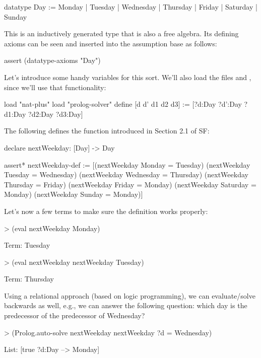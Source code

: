 \begin{tcAthena}
datatype Day := Monday | Tuesday | Wednesday | Thursday | Friday | Saturday | Sunday 
\end{tcAthena}
This is an inductively generated type that is also a free algebra. Its defining axioms can be seen
and inserted into the assumption base as follows:
\begin{tcAthena}
assert (datatype-axioms "Day")
\end{tcAthena}
Let's introduce some handy variables for this sort. We'll also load the files  and , since we'll
use that functionality: 
\begin{tcAthena}
load "nat-plus"
load "prolog-solver"
define [d d' d1 d2 d3] := [?d:Day ?d':Day ?d1:Day ?d2:Day ?d3:Day]
\end{tcAthena}
The following defines the  function introduced in Section 2.1 of SF: 
\begin{tcAthena}
declare nextWeekday: [Day] -> Day 

assert* nextWeekday-def := 
   [(nextWeekday Monday    = Tuesday)
    (nextWeekday Tuesday   = Wednesday)
    (nextWeekday Wednesday = Thursday)
    (nextWeekday Thursday  = Friday)
    (nextWeekday Friday    = Monday)
    (nextWeekday Saturday  = Monday)
    (nextWeekday Sunday    = Monday)]
\end{tcAthena}
Let's now  a few terms to make sure the definition works properly:
\begin{tcAthena}
> (eval nextWeekday Monday)

Term: Tuesday

> (eval nextWeekday nextWeekday Tuesday)

Term: Thursday 
\end{tcAthena}
Using a relational approach (based on logic programming), we can evaluate/solve backwards as well, e.g., 
we can answer the following question: which day is the predecessor of the predecessor of Wednesday? 
\begin{tcAthena}
> (Prolog.auto-solve nextWeekday nextWeekday ?d = Wednesday)

List: [true {?d:Day --> Monday}]
\end{tcAthena}

